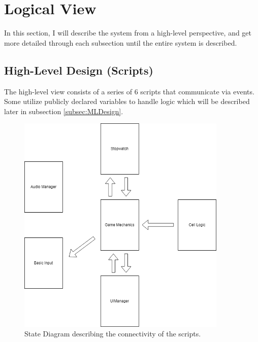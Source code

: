 \section{Logical View}
\label{sec:LogView}

In this section, I will describe the system from a high-level perspective, and get more detailed through each subsection until the entire system is described.

\subsection{High-Level Design (Scripts)}
\label{subsec:HLDesign}

The high-level view consists of a series of 6 scripts that communicate via events.
Some utilize publicly declared variables to handle logic which will be described later in subsection \ref{subsec:MLDesign}.

\begin{figure}[h]
    \centering
    \includegraphics[width=10cm]{Images/HighLevelLogView.png}
       \caption{State Diagram describing the connectivity of the scripts.}
           \label{Fig:HighLevelLogView}
\end{figure}

